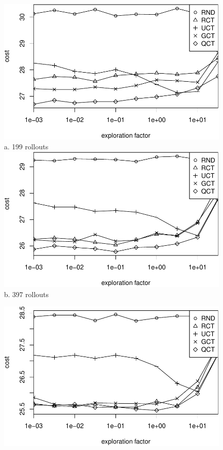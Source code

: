 \documentclass{article}
\begin{document}
\begin{figure}[t]
  \begin{minipage}[b]{0.5\linewidth}
    \centering
    \includegraphics[scale=0.45]{costs-size=6-nsamples=199.pdf}\\
    a. 199 rollouts\\
    \vspace{1em}
    \includegraphics[scale=0.45]{costs-size=6-nsamples=397.pdf}\\
    b. 397 rollouts\\
  \end{minipage}
  \begin{minipage}[b]{0.5\linewidth}
    \centering
    \includegraphics[scale=0.45]{costs-size=6-nsamples=793.pdf}\\

\end{minipage}
\end{figure}
\end{document}
